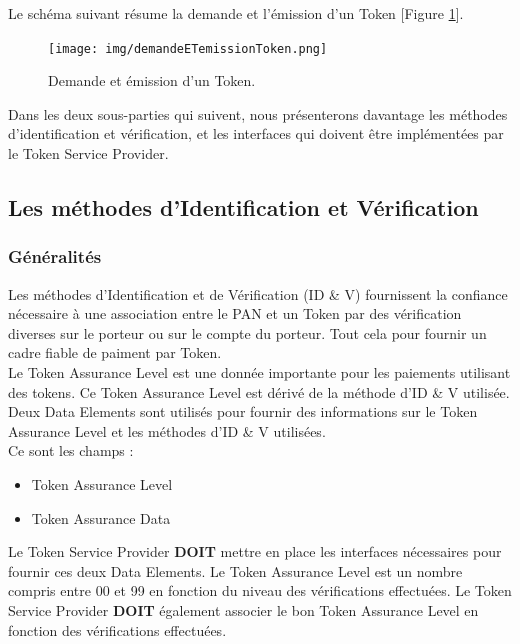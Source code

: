\documentclass{report}
\begin{document}
\noindent
Le schéma suivant résume la demande et l'émission d'un Token [Figure \ref{DemandeEmissionToken}].

\begin{figure}[!ht]
    \centering
			\texttt{[image: img/demandeETemissionToken.png]}
			\caption{\label{DemandeEmissionToken} Demande et émission d'un Token.}			
\end{figure}

Dans les deux sous-parties qui suivent, nous présenterons davantage les méthodes d'identification et vérification, et les interfaces qui doivent être implémentées par le Token Service Provider.

\subsection{Les méthodes d'Identification et Vérification}

\subsubsection{Généralités}
Les méthodes d'Identification et de Vérification (ID \& V) fournissent la confiance nécessaire à une association entre le PAN et un Token par des vérification diverses sur le porteur ou sur le compte du porteur. Tout cela pour fournir un cadre fiable de paiment par Token. \\
Le Token Assurance Level est une donnée importante pour les paiements utilisant des tokens. Ce Token Assurance Level est dérivé de la méthode d'ID \& V utilisée.
Deux Data Elements sont utilisés pour fournir des informations sur le Token Assurance Level et les méthodes d'ID \& V utilisées.\\
Ce sont les champs : 
\begin{itemize}
	\item Token Assurance Level
	\item Token Assurance Data\\
\end{itemize}

Le Token Service Provider \textbf{DOIT} mettre en place les interfaces nécessaires pour fournir ces deux Data Elements.
Le Token Assurance Level est un nombre compris entre 00 et 99 en fonction du niveau des vérifications effectuées. Le Token Service Provider \textbf{DOIT} également associer le bon Token Assurance Level en fonction des vérifications effectuées.
\end{document}
